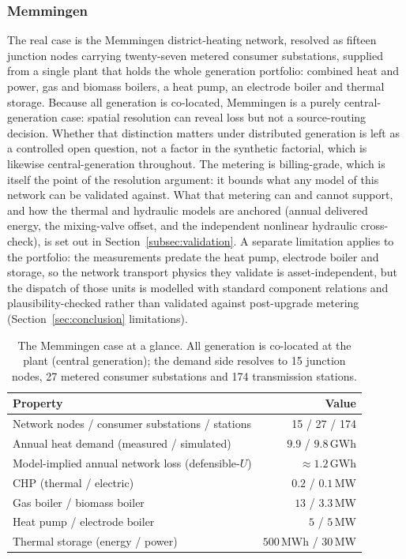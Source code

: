 \documentclass[a4paper,fleqn]{cas-sc}
\begin{document}
\subsubsection{Memmingen}
The real case is the Memmingen district-heating network, resolved as fifteen junction nodes
carrying twenty-seven metered consumer substations, supplied from a single plant that holds
the whole generation portfolio: combined heat and power, gas and biomass boilers, a heat
pump, an electrode boiler and thermal storage. Because all generation is co-located, Memmingen
is a purely central-generation case: spatial resolution can reveal loss but not a source-routing
decision. Whether that distinction matters under distributed generation is left as a controlled
open question, not a factor in the synthetic factorial, which is likewise central-generation
throughout. The metering is
billing-grade, which is itself the point of the resolution argument: it bounds what any model
of this network can be validated against. What that metering can and cannot support, and how the
thermal and hydraulic models are anchored (annual delivered energy, the mixing-valve offset, and the
independent nonlinear hydraulic cross-check), is set out in Section~\ref{subsec:validation}. A separate
limitation applies to the portfolio: the measurements predate the heat pump, electrode boiler
and storage, so the network transport physics they validate is asset-independent, but the
dispatch of those units is modelled with standard component relations and plausibility-checked
rather than validated against post-upgrade metering (Section~\ref{sec:conclusion} limitations).
\begin{table}[t]
\centering
\caption{The Memmingen case at a glance. All generation is co-located at the plant (central
generation); the demand side resolves to 15 junction nodes, 27 metered consumer substations and
174 transmission stations.}
\label{tab:casesummary}
\begin{tabular}{lr}
\hline
Property & Value \\
\hline
Network nodes / consumer substations / stations & 15 / 27 / 174 \\
Annual heat demand (measured / simulated) & $9.9$ / $9.8$\,GWh \\
Model-implied annual network loss (defensible-$U$) & $\approx 1.2$\,GWh \\
CHP (thermal / electric) & $0.2$ / $0.1$\,MW \\
Gas boiler / biomass boiler & $13$ / $3.3$\,MW \\
Heat pump / electrode boiler & $5$ / $5$\,MW \\
Thermal storage (energy / power) & $500$\,MWh / $30$\,MW \\
\hline
\end{tabular}
\end{table}
\end{document}
